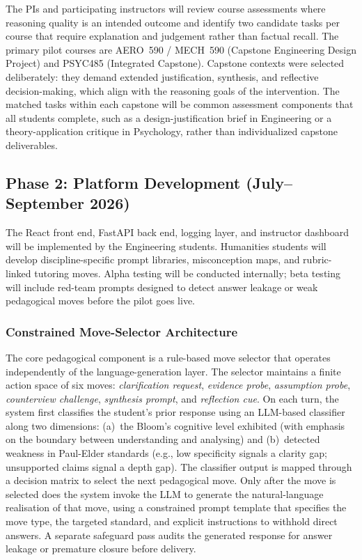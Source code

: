 \documentclass[11pt,a4paper]{article}
\begin{document}
The PIs and participating instructors will review course assessments where reasoning quality is an intended outcome and identify two candidate tasks per course that require explanation and judgement rather than factual recall. The primary pilot courses are AERO~590 / MECH~590 (Capstone Engineering Design Project) and PSYC485 (Integrated Capstone). Capstone contexts were selected deliberately: they demand extended justification, synthesis, and reflective decision-making, which align with the reasoning goals of the intervention. The matched tasks within each capstone will be common assessment components that all students complete, such as a design-justification brief in Engineering or a theory-application critique in Psychology, rather than individualized capstone deliverables.

\subsection*{Phase 2: Platform Development (July--September 2026)}

The React front end, FastAPI back end, logging layer, and instructor dashboard will be implemented by the Engineering students. Humanities students will develop discipline-specific prompt libraries, misconception maps, and rubric-linked tutoring moves. Alpha testing will be conducted internally; beta testing will include red-team prompts designed to detect answer leakage or weak pedagogical moves before the pilot goes live.

\subsubsection*{Constrained Move-Selector Architecture}

The core pedagogical component is a rule-based move selector that operates independently of the language-generation layer. The selector maintains a finite action space of six moves: \textit{clarification request}, \textit{evidence probe}, \textit{assumption probe}, \textit{counterview challenge}, \textit{synthesis prompt}, and \textit{reflection cue}. On each turn, the system first classifies the student's prior response using an LLM-based classifier along two dimensions: (a)~the Bloom's cognitive level exhibited (with emphasis on the boundary between understanding and analysing) and (b)~detected weakness in Paul-Elder standards (e.g., low specificity signals a clarity gap; unsupported claims signal a depth gap). The classifier output is mapped through a decision matrix to select the next pedagogical move. Only after the move is selected does the system invoke the LLM to generate the natural-language realisation of that move, using a constrained prompt template that specifies the move type, the targeted standard, and explicit instructions to withhold direct answers. A separate safeguard pass audits the generated response for answer leakage or premature closure before delivery.
\end{document}

